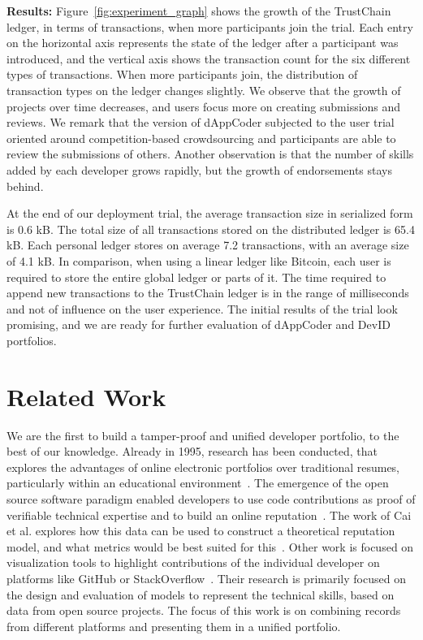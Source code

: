 \textbf{Results:}
Figure~\ref{fig:experiment_graph} shows the growth of the TrustChain ledger, in terms of transactions, when more participants join the trial.
Each entry on the horizontal axis represents the state of the ledger after a participant was introduced, and the vertical axis shows the transaction count for the six different types of transactions.
When more participants join, the distribution of transaction types on the ledger changes slightly.
We observe that the growth of projects over time decreases, and users focus more on creating submissions and reviews.
We remark that the version of dAppCoder subjected to the user trial oriented around competition-based crowdsourcing and participants are able to review the submissions of others.
Another observation is that the number of skills added by each developer grows rapidly, but the growth of endorsements stays behind.

At the end of our deployment trial, the average transaction size in serialized form is 0.6 kB.
The total size of all transactions stored on the distributed ledger is 65.4 kB.
Each personal ledger stores on average 7.2 transactions, with an average size of 4.1 kB.
In comparison, when using a linear ledger like Bitcoin, each user is required to store the entire global ledger or parts of it.  
The time required to append new transactions to the TrustChain ledger is in the range of milliseconds and not of influence on the user experience.
The initial results of the trial look promising, and we are ready for further evaluation of dAppCoder and DevID portfolios. 

\section{Related Work}
We are the first to build a tamper-proof and unified developer portfolio, to the best of our knowledge.
Already in 1995, research has been conducted, that explores the advantages of online electronic portfolios over traditional resumes, particularly within an educational environment~\cite{riggsby1995electronic,barrett2000electronic}.
The emergence of the open source software paradigm enabled developers to use code contributions as proof of verifiable technical expertise and to build an online reputation~\cite{riehle2015open}.
The work of Cai et al. explores how this data can be used to construct a theoretical reputation model, and what metrics would be best suited for this~\cite{cai2016reputation}.
Other work is focused on visualization tools to highlight contributions of the individual developer on platforms like GitHub or StackOverflow~\cite{jaruchotrattanasakul2016open,saxena2017know,chen2016supporting}.
Their research is primarily focused on the design and evaluation of models to represent the technical skills, based on data from open source projects.
The focus of this work is on combining records from different platforms and presenting them in a unified portfolio.

